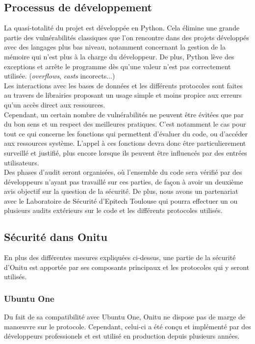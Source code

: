 \subsection{Processus de développement}

La quasi-totalité du projet est développée en Python. Cela élimine une grande partie des vulnérabilités classiques que l'on rencontre dans des projets développés avec des langages plus bas niveau, notamment concernant la gestion de la mémoire qui n'est plus à la charge du développeur. De plus, Python lève des exceptions et arrête le programme dès qu'une valeur n'est pas correctement utilisée. (\textit{overflows}, \textit{casts} incorects...)\\

Les interactions avec les bases de données et les différents protocoles sont faites au travers de librairies proposant un usage simple et moins propice aux erreurs qu'un accès direct aux ressources.\\

Cependant, un certain nombre de vulnérabilités ne peuvent être évitées que par du bon sens et un respect des meilleures pratiques. C'est notamment le cas pour tout ce qui concerne les fonctions qui permettent d'évaluer du code, ou d'accéder aux ressources système. L'appel à ces fonctions devra donc être particulierement surveillé et justifié, plus encore lorsque ils peuvent être influencés par des entrées utilisateurs.\\

Des phases d'audit seront organisées, où l'ensemble du code sera vérifié par des développeurs n'ayant pas travaillé sur ces parties, de façon à avoir un deuxième avis objectif sur la question de la sécurité. De plus, nous avons un partenariat avec le Laboratoire de Sécurité d'Epitech Toulouse qui pourra effectuer un ou plusieurs audits extérieurs sur le code et les différents protocoles utilisés.

\subsection{Sécurité dans Onitu}

En plus des différentes mesures expliquées ci-dessus, une partie de la sécurité d'Onitu est apportée par ses composants principaux et les protocoles qui y seront utilisés.

\subsubsection{Ubuntu One}
Du fait de sa compatibilité avec Ubuntu One, Onitu ne dispose pas de marge de manœuvre sur le protocole. Cependant, celui-ci a été conçu et implémenté par des développeurs professionels et est utilisé en production depuis plusieurs années.\\

